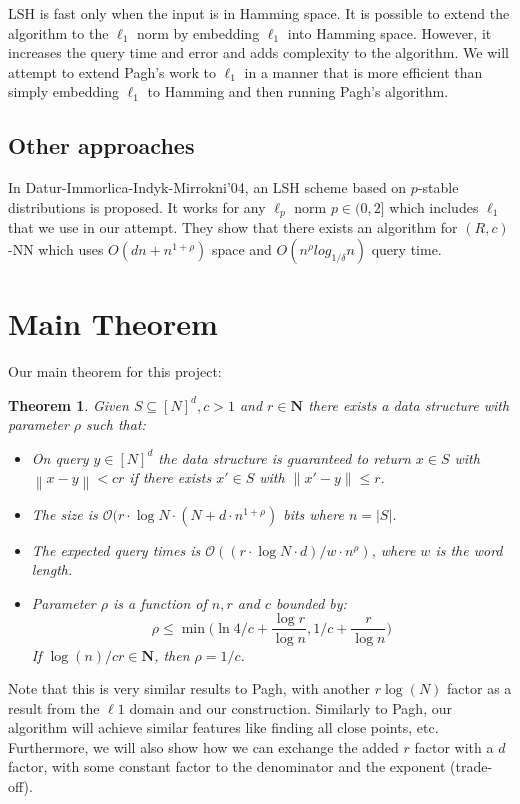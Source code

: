\documentclass{scrartcl}
\newcommand{\BO}{{\mathcal{O}}}
\newtheorem{theorem}{Theorem}
\newcommand{\norm}[1]{\left\lVert#1\right\rVert}
\begin{document}
LSH is fast only when the input is in Hamming space. It is possible to extend the algorithm to the $\ell_1$ norm by embedding $\ell_1$ into Hamming space. However, it increases the query time and error and adds complexity to the algorithm. We will attempt to extend Pagh's work to $\ell_1$ in a manner that is more efficient than simply embedding $\ell_1$ to Hamming and then running Pagh's algorithm.

\subsection{Other approaches}
In Datur-Immorlica-Indyk-Mirrokni'04, an LSH scheme based on $p$-stable distributions is proposed. It works for any $\ell_p$ norm $p \in (0, 2]$ which includes $\ell_1$ that we use in our attempt. They show that there exists an
algorithm for $(R,c)$-NN which uses $O(dn + n^{1+\rho})$ space and $O(n^\rho log_{1/\delta}{n})$ query time.



\section{Main Theorem}
Our main theorem for this project:
\begin{theorem}
Given $S \subseteq [N]^d, c>1$ and $r \in \mathbf{N}$ there exists a data structure with parameter $\rho$ such that:
\begin{itemize}
	\item On query $y \in [N]^d$ the data structure is guaranteed to return $x \in S$ with $\norm{x-y} < cr$ if there exists $x' \in S$ with $\norm{x'-y} \leq r$.
	\item The size is $\BO(r\cdot \log{N} \cdot (N+ d \cdot n^{1+\rho})$ bits where $n = |S|$.
	\item The expected query times is $\BO((r\cdot \log{N} \cdot d)/w \cdot n^{\rho})$, where $w$ is the word length.
	\item Parameter $\rho$ is a function of $n, r$ and $c$ bounded by:
	$$\rho \leq \min{\Big(\ln{4}/c + \frac{\log{r}}{\log{n}}, 1/c + \frac{r}{\log{n}}\Big)}$$
	 If $\log{(n)}/cr \in \mathbf{N}$, then $\rho = 1/c$.
\end{itemize}
\end{theorem}

Note that this is very similar results to Pagh, with another $r\log(N)$ factor as a result from the $\ell1$ domain and our construction. Similarly to Pagh, our algorithm will achieve similar features like finding all close points, etc.
Furthermore, we will also show how we can exchange the added $r$ factor with a $d$ factor, with some constant factor to the denominator and the exponent (trade-off).
\end{document}
